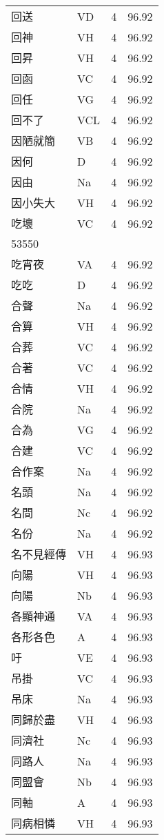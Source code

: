 \documentclass[twocolumn]{book}
\begin{document}
\begin{supertabular}{llrr}
回送 & VD & 4 &  96.92\\
回神 & VH & 4 &  96.92\\
回昇 & VH & 4 &  96.92\\
回函 & VC & 4 &  96.92\\
回任 & VG & 4 &  96.92\\
回不了 & VCL & 4 &  96.92\\
因陋就簡 & VB & 4 &  96.92\\
因何 & D & 4 &  96.92\\
因由 & Na & 4 &  96.92\\
因小失大 & VH & 4 &  96.92\\
吃壞 & VC & 4 &  96.92\\
53550\\
吃宵夜 & VA & 4 &  96.92\\
吃吃 & D & 4 &  96.92\\
合聲 & Na & 4 &  96.92\\
合算 & VH & 4 &  96.92\\
合葬 & VC & 4 &  96.92\\
合著 & VC & 4 &  96.92\\
合情 & VH & 4 &  96.92\\
合院 & Na & 4 &  96.92\\
合為 & VG & 4 &  96.92\\
合建 & VC & 4 &  96.92\\
合作案 & Na & 4 &  96.92\\
名頭 & Na & 4 &  96.92\\
名間 & Nc & 4 &  96.92\\
名份 & Na & 4 &  96.92\\
名不見經傳 & VH & 4 &  96.93\\
向陽 & VH & 4 &  96.93\\
向陽 & Nb & 4 &  96.93\\
各顯神通 & VA & 4 &  96.93\\
各形各色 & A & 4 &  96.93\\
吁 & VE & 4 &  96.93\\
吊掛 & VC & 4 &  96.93\\
吊床 & Na & 4 &  96.93\\
同歸於盡 & VH & 4 &  96.93\\
同濟社 & Nc & 4 &  96.93\\
同路人 & Na & 4 &  96.93\\
同盟會 & Nb & 4 &  96.93\\
同軸 & A & 4 &  96.93\\
同病相憐 & VH & 4 &  96.93\\

\end{supertabular}
\end{document}
